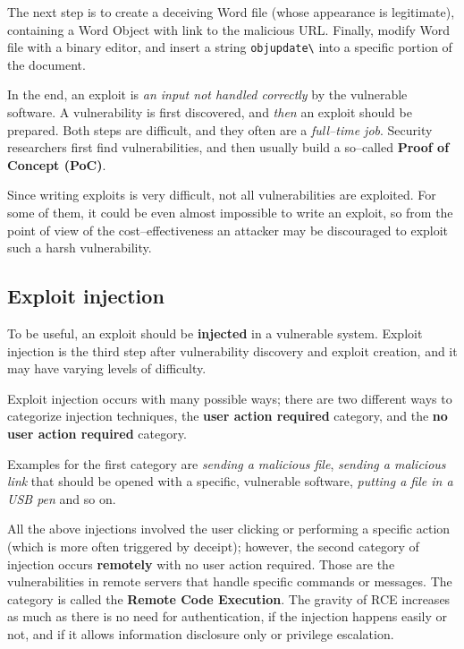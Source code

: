 \documentclass[10pt]{extbook}
\begin{document}
The next step is to create a deceiving Word file (whose appearance is
legitimate), containing a Word Object with link to the malicious URL. Finally,
modify Word file with a binary editor, and insert a string
\texttt{objupdate\textbackslash} into a specific portion of the document.

In the end, an exploit is \emph{an input not handled correctly} by the
vulnerable software. A vulnerability is first discovered, and \emph{then} an
exploit should be prepared. Both steps are difficult, and they often are a
\emph{full--time job}. Security researchers first find vulnerabilities, and
then usually build a so--called \textbf{Proof of Concept (PoC)}.

Since writing exploits is very difficult, not all vulnerabilities are
exploited. For some of them, it could be even almost impossible to write an
exploit, so from the point of view of the cost--effectiveness an attacker may
be discouraged to exploit such a harsh vulnerability.

\subsection{Exploit injection}

To be useful, an exploit should be \textbf{injected} in a vulnerable system.
Exploit injection is the third step after vulnerability discovery and exploit
creation, and it may have varying levels of difficulty.

Exploit injection occurs with many possible ways; there are two different ways
to categorize injection techniques, the \textbf{user action required} category,
and the \textbf{no user action required} category.

Examples for the first category are \emph{sending
a malicious file}, \emph{sending a malicious link} that should be opened
with a specific, vulnerable software, \emph{putting a file in a USB pen} and
so on.

All the above injections involved the user clicking or performing a specific
action (which is more often triggered by deceipt); however, the second category
of injection occurs \textbf{remotely} with no user action required. Those are
the vulnerabilities in remote servers that handle specific commands or
messages. The category is called the \textbf{Remote Code Execution}. The
gravity of RCE increases as much as there is no need for authentication, if the
injection happens easily or not, and if it allows information disclosure only
or privilege escalation.
\end{document}
